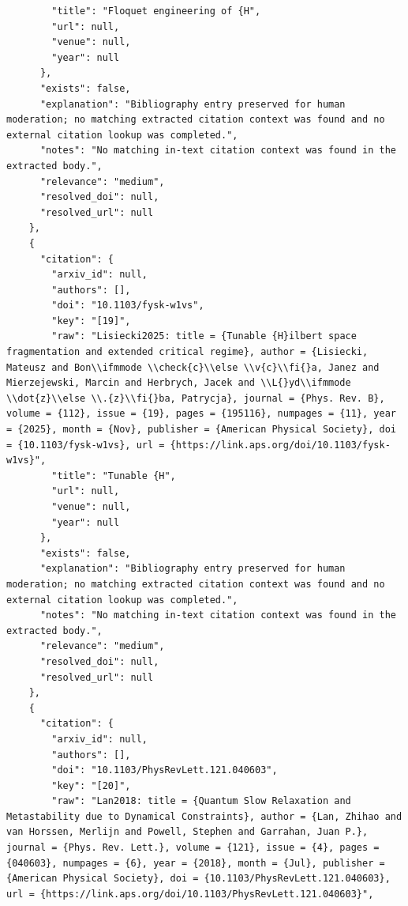 \documentclass[11pt]{article}
\begin{document}
\begin{verbatim}
        "title": "Floquet engineering of {H",
        "url": null,
        "venue": null,
        "year": null
      },
      "exists": false,
      "explanation": "Bibliography entry preserved for human moderation; no matching extracted citation context was found and no external citation lookup was completed.",
      "notes": "No matching in-text citation context was found in the extracted body.",
      "relevance": "medium",
      "resolved_doi": null,
      "resolved_url": null
    },
    {
      "citation": {
        "arxiv_id": null,
        "authors": [],
        "doi": "10.1103/fysk-w1vs",
        "key": "[19]",
        "raw": "Lisiecki2025: title = {Tunable {H}ilbert space fragmentation and extended critical regime}, author = {Lisiecki, Mateusz and Bon\\ifmmode \\check{c}\\else \\v{c}\\fi{}a, Janez and Mierzejewski, Marcin and Herbrych, Jacek and \\L{}yd\\ifmmode \\dot{z}\\else \\.{z}\\fi{}ba, Patrycja}, journal = {Phys. Rev. B}, volume = {112}, issue = {19}, pages = {195116}, numpages = {11}, year = {2025}, month = {Nov}, publisher = {American Physical Society}, doi = {10.1103/fysk-w1vs}, url = {https://link.aps.org/doi/10.1103/fysk-w1vs}",
        "title": "Tunable {H",
        "url": null,
        "venue": null,
        "year": null
      },
      "exists": false,
      "explanation": "Bibliography entry preserved for human moderation; no matching extracted citation context was found and no external citation lookup was completed.",
      "notes": "No matching in-text citation context was found in the extracted body.",
      "relevance": "medium",
      "resolved_doi": null,
      "resolved_url": null
    },
    {
      "citation": {
        "arxiv_id": null,
        "authors": [],
        "doi": "10.1103/PhysRevLett.121.040603",
        "key": "[20]",
        "raw": "Lan2018: title = {Quantum Slow Relaxation and Metastability due to Dynamical Constraints}, author = {Lan, Zhihao and van Horssen, Merlijn and Powell, Stephen and Garrahan, Juan P.}, journal = {Phys. Rev. Lett.}, volume = {121}, issue = {4}, pages = {040603}, numpages = {6}, year = {2018}, month = {Jul}, publisher = {American Physical Society}, doi = {10.1103/PhysRevLett.121.040603}, url = {https://link.aps.org/doi/10.1103/PhysRevLett.121.040603}",

\end{verbatim}
\end{document}
